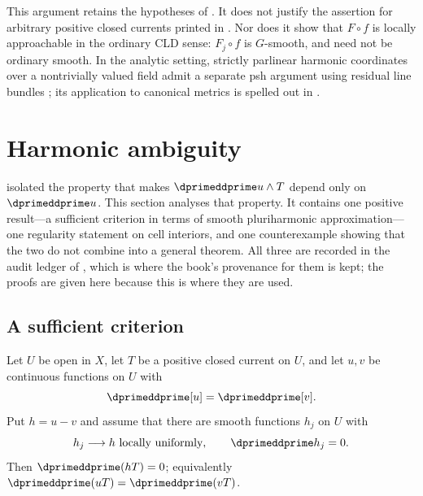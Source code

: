This argument retains the hypotheses of
\cite[Proposition~8.11.1]{CLD25}.  It does not justify the assertion for
arbitrary positive closed currents printed in
\cite[Corollary~8.11.3]{CLD25}.  Nor does it show that $F\circ f$ is
locally approachable in the ordinary CLD sense: $F_j\circ f$ is
$G$-smooth, and need not be ordinary smooth.  In the analytic setting,
strictly parlinear harmonic coordinates over a nontrivially valued field
admit a separate psh argument using residual line bundles
\cite[Corollary~18.8.9]{CLD25}; its application to canonical metrics is
spelled out in .

\section{Harmonic ambiguity}
\label{sec:ch16-harmonic-ambiguity}

 isolated the property that makes
$\dprimeddprime u\wedge T$ depend only on $\dprimeddprime u$.  This section
analyses that property.  It contains one positive result---a sufficient
criterion in terms of smooth pluriharmonic approximation---one regularity
statement on cell interiors, and one counterexample showing that the two do
not combine into a general theorem.  All three are recorded in the audit
ledger of , which is where the book's
provenance for them is kept; the proofs are given here because this is where
they are used.

\subsection{A sufficient criterion}
\label{sec:ch16-pluriharmonic-criterion}

\begin{theorem}
\label{thm:ch16-pluriharmonic-criterion}
Let $U$ be open in $X$, let $T$ be a positive closed current on $U$, and let
$u,v$ be continuous functions on $U$ with
\begin{equation}
\label{eq:ch16-equal-hessians}
 \dprimeddprime[u]=\dprimeddprime[v].
\end{equation}
Put $h=u-v$ and assume that there are smooth functions $h_j$ on $U$ with
\begin{equation}
\label{eq:ch16-pluriharmonic-approximation}
 h_j\longrightarrow h\ \text{locally uniformly},
 \qquad
 \dprimeddprime h_j=0 .
\end{equation}
Then $\dprimeddprime(hT)=0$; equivalently
$\dprimeddprime(uT)=\dprimeddprime(vT)$.
\end{theorem}

